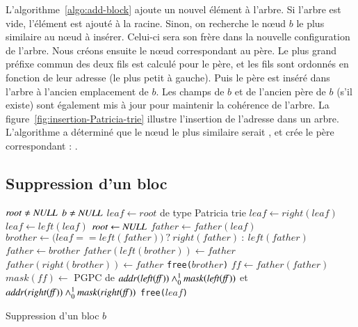 


L'algorithme~\ref{algo:add-block} ajoute un nouvel élément à l'arbre.
Si l'arbre est vide, l'élément est ajouté à la racine.
Sinon, on recherche le n\oe{}ud $b$ le plus similaire au n\oe{}ud à insérer.
Celui-ci sera son frère dans la nouvelle configuration de l'arbre.
Nous créons ensuite le n\oe{}ud correspondant au père.
Le plus grand préfixe commun des deux fils est calculé pour le père, et les fils
sont ordonnés en fonction de leur adresse (le plus petit à gauche).
Puis le père est inséré dans l'arbre à l'ancien emplacement de $b$.
Les champs de $b$ et de l'ancien père de $b$ (s'il existe) sont également mis à
jour pour maintenir la cohérence de l'arbre.
La figure~\ref{fig:insertion-Patricia-trie} illustre l'insertion de l'adresse
 dans un arbre.
L'algorithme a déterminé que le n\oe{}ud le plus similaire serait
, et crée le père correspondant :
.


\subsection{Suppression d'un bloc}

\begin{algorithm}
\begin{algorithmic}
\Require $\mathit{root} \neq \mathit{NULL}$
\Require $b \neq \mathit{NULL}$
\State $\mathit{leaf} \gets \mathit{root}$ de type Patricia trie
    \State $\mathit{leaf} \gets \mathit{right(leaf)}$
  \Else
    \State $\mathit{leaf} \gets \mathit{left(leaf)}$
  \EndIf
\EndWhile
{}
  \State $\mathit{root} \gets \mathit{NULL}$
\Else
  \State $\mathit{father} \gets \mathit{father(leaf)}$
  \State $\mathit{brother} \gets (\mathit{leaf} == \mathit{left(father))} ~?~ \mathit{right(father)} ~:~ \mathit{left(father)}$
  \State $\mathit{father} \gets \mathit{brother}$
    \State $\mathit{father(left(brother))} \gets \mathit{father}$
    \State $\mathit{father(right(brother))} \gets \mathit{father}$
  \EndIf
  \State \lstinline'free('$\mathit{brother}$\lstinline')'
  \State $\mathit{ff} \gets \mathit{father(father)}$
    \State $\mathit{mask(ff)} \gets$ PGPC de $\mathit{addr(left(ff))} \land_0^1 \mathit{mask(left(ff))}$ et $\mathit{addr(right(ff))} \land_0^1 \mathit{mask(right(ff))}$
  \EndIf
\EndIf
\State \lstinline'free('$\mathit{leaf}$\lstinline')'
\end{algorithmic}
\caption{Suppression d'un bloc $b$
  \label{algo:remove-block}}
\end{algorithm}

